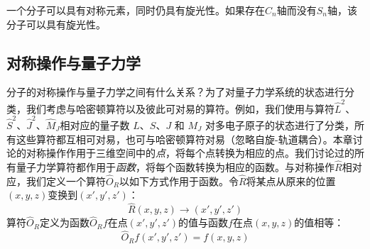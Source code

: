     一个分子可以具有对称元素，同时仍具有旋光性。如果存在$C_n$轴而没有$S_n$轴，该分子可以具有旋光性。

\subsection*{对称操作与量子力学}

    分子的对称操作与量子力学之间有什么关系？为了对量子力学系统的状态进行分类，我们考虑与哈密顿算符以及彼此可对易的算符。例如，我们使用与算符$\hat{L}^2$、$\hat{S}^2$、$\hat{J}^2$、$\hat{M}_J$相对应的量子数 $L$、$S$、$J$ 和 $M_J$ 对多电子原子的状态进行了分类，所有这些算符都互相可对易，也可与哈密顿算符对易（忽略自旋-轨道耦合）。本章讨论的对称操作作用于三维空间中的\textit{点}，将每个点转换为相应的点。我们讨论过的所有量子力学算符都作用于\textit{函数}，将每个函数转换为相应的函数。与对称操作$\hat{R}$相对应，我们定义一个算符$\hat{O}_R$以如下方式作用于函数。令$\hat{R}$将某点从原来的位置$\left(x,y,z\right)$变换到$\left(x',y',z'\right)$：
    \begin{equation}
        \hat{R}\left(x,y,z\right) \to \left(x',y',z'\right)
        \label{eq:12.1}
    \end{equation}
    算符$\hat{O}_R$定义为函数$\hat{O}_Rf$在点$\left(x',y',z'\right)$的值与函数$f$在点$\left(x,y,z\right)$的值相等：
    \begin{equation}
        \hat{O}_Rf\left(x',y',z'\right) = f\left(x,y,z\right)
        \label{eq:12.2}
    \end{equation}

